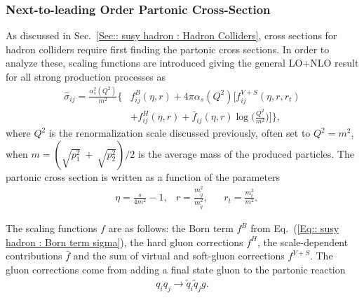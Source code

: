 \documentclass[twoside,english]{uiofysmaster}
\begin{document}
{\subsubsection{Next-to-leading Order Partonic Cross-Section}

As discussed in Sec.~\ref{Sec:: susy hadron : Hadron Colliders}, cross sections for hadron colliders require first finding the partonic cross sections. In order to analyze these, scaling functions are introduced \cite{beenakker1997squark} giving the general LO+NLO result for all strong production processes as
\begin{align}\label{Eq:: susy hadron : Partonic cross section LO+NLO}
\hat{\sigma}_{ij} = \frac{\alpha_s^2(Q^2)}{m^2} \Big\{ &f^B_{ij}(\eta, r) + 4 \pi \alpha_s (Q^2) \Bigg[ f_{ij}^{V+S}(\eta, r, r_t) \nonumber \\ & + f_{ij}^H (\eta, r) + \bar{f}_{ij} (\eta, r) \log \Bigg( \frac{Q^2}{m^2}\Bigg) \Bigg] \Big\},
\end{align}
where $Q^2$ is the renormalization scale discussed previously, often set to $Q^2 = m^2$, when $m = (\sqrt{p_1^2}~+~\sqrt{p_2^2})/2$ is the average mass of the produced particles. The partonic cross section is written as a function of the parameters
\begin{align}
&\eta = \frac{s}{4m^2} -1, &r= \frac{m_{\widetilde{g}}^2}{m_{\widetilde{q}}^2}, &&r_t = \frac{m_t^2}{m^2}.
\end{align} 

The scaling functions $f$ are as follows: the Born term $f^B$ from Eq.~(\ref{Eq:: susy hadron : Born term sigma}), the hard gluon corrections $f^H$, the scale-dependent contributions $\bar{f}$ and the sum of virtual and soft-gluon corrections $f^{V+S}$. The gluon corrections come from adding a final state gluon to the partonic reaction
\begin{align}
q_i q_j \rightarrow \widetilde{q}_i  \widetilde{q}_j g.
\end{align}

}
\end{document}
